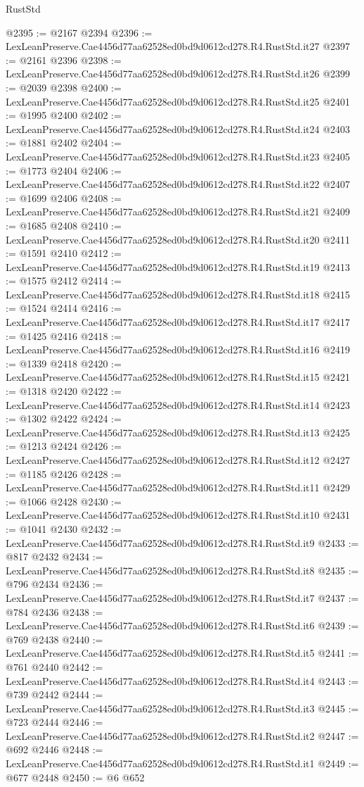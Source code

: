 \begin{lexlean}{RustStd}
\begin{coremodule}
@2395 := @2167 @2394
@2396 := LexLeanPreserve.Cae4456d77aa62528ed0bd9d0612cd278.R4.RustStd.it27
@2397 := @2161 @2396
@2398 := LexLeanPreserve.Cae4456d77aa62528ed0bd9d0612cd278.R4.RustStd.it26
@2399 := @2039 @2398
@2400 := LexLeanPreserve.Cae4456d77aa62528ed0bd9d0612cd278.R4.RustStd.it25
@2401 := @1995 @2400
@2402 := LexLeanPreserve.Cae4456d77aa62528ed0bd9d0612cd278.R4.RustStd.it24
@2403 := @1881 @2402
@2404 := LexLeanPreserve.Cae4456d77aa62528ed0bd9d0612cd278.R4.RustStd.it23
@2405 := @1773 @2404
@2406 := LexLeanPreserve.Cae4456d77aa62528ed0bd9d0612cd278.R4.RustStd.it22
@2407 := @1699 @2406
@2408 := LexLeanPreserve.Cae4456d77aa62528ed0bd9d0612cd278.R4.RustStd.it21
@2409 := @1685 @2408
@2410 := LexLeanPreserve.Cae4456d77aa62528ed0bd9d0612cd278.R4.RustStd.it20
@2411 := @1591 @2410
@2412 := LexLeanPreserve.Cae4456d77aa62528ed0bd9d0612cd278.R4.RustStd.it19
@2413 := @1575 @2412
@2414 := LexLeanPreserve.Cae4456d77aa62528ed0bd9d0612cd278.R4.RustStd.it18
@2415 := @1524 @2414
@2416 := LexLeanPreserve.Cae4456d77aa62528ed0bd9d0612cd278.R4.RustStd.it17
@2417 := @1425 @2416
@2418 := LexLeanPreserve.Cae4456d77aa62528ed0bd9d0612cd278.R4.RustStd.it16
@2419 := @1339 @2418
@2420 := LexLeanPreserve.Cae4456d77aa62528ed0bd9d0612cd278.R4.RustStd.it15
@2421 := @1318 @2420
@2422 := LexLeanPreserve.Cae4456d77aa62528ed0bd9d0612cd278.R4.RustStd.it14
@2423 := @1302 @2422
@2424 := LexLeanPreserve.Cae4456d77aa62528ed0bd9d0612cd278.R4.RustStd.it13
@2425 := @1213 @2424
@2426 := LexLeanPreserve.Cae4456d77aa62528ed0bd9d0612cd278.R4.RustStd.it12
@2427 := @1185 @2426
@2428 := LexLeanPreserve.Cae4456d77aa62528ed0bd9d0612cd278.R4.RustStd.it11
@2429 := @1066 @2428
@2430 := LexLeanPreserve.Cae4456d77aa62528ed0bd9d0612cd278.R4.RustStd.it10
@2431 := @1041 @2430
@2432 := LexLeanPreserve.Cae4456d77aa62528ed0bd9d0612cd278.R4.RustStd.it9
@2433 := @817 @2432
@2434 := LexLeanPreserve.Cae4456d77aa62528ed0bd9d0612cd278.R4.RustStd.it8
@2435 := @796 @2434
@2436 := LexLeanPreserve.Cae4456d77aa62528ed0bd9d0612cd278.R4.RustStd.it7
@2437 := @784 @2436
@2438 := LexLeanPreserve.Cae4456d77aa62528ed0bd9d0612cd278.R4.RustStd.it6
@2439 := @769 @2438
@2440 := LexLeanPreserve.Cae4456d77aa62528ed0bd9d0612cd278.R4.RustStd.it5
@2441 := @761 @2440
@2442 := LexLeanPreserve.Cae4456d77aa62528ed0bd9d0612cd278.R4.RustStd.it4
@2443 := @739 @2442
@2444 := LexLeanPreserve.Cae4456d77aa62528ed0bd9d0612cd278.R4.RustStd.it3
@2445 := @723 @2444
@2446 := LexLeanPreserve.Cae4456d77aa62528ed0bd9d0612cd278.R4.RustStd.it2
@2447 := @692 @2446
@2448 := LexLeanPreserve.Cae4456d77aa62528ed0bd9d0612cd278.R4.RustStd.it1
@2449 := @677 @2448
@2450 := @6 @652

\end{coremodule}
\end{lexlean}
